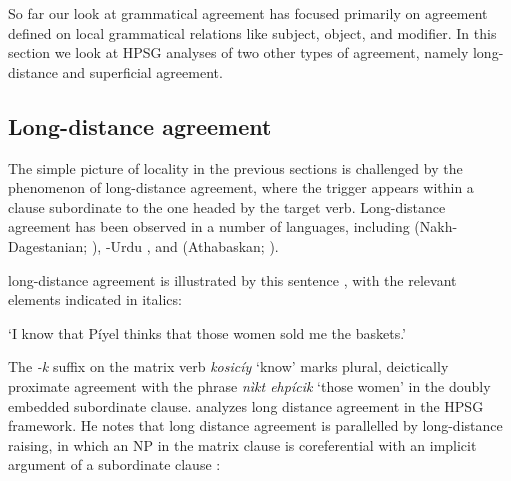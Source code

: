 \documentclass[output=paper,biblatex,babelshorthands,newtxmath,draftmode,colorlinks,citecolor=brown]{langscibook}
\begin{document}
So far our look at grammatical agreement has focused primarily on agreement defined on local grammatical relations like subject, object, and modifier.  In this section we look at HPSG analyses of two other types of agreement, namely long-distance and superficial agreement.  

\subsection{Long-distance agreement}
\label{LDA}

The simple picture of locality in the previous sections is challenged by the phenomenon of
long-distance agreement, where the trigger appears within a clause subordinate to the one headed by
the target verb.  Long-distance agreement has been observed in a number of languages, including
 (Nakh-Dagestanian; \citealt{polinsky+potsdam:2001}), -Urdu \citep{bhatt:2005},
and  (Athabaskan; \citealt{bruening:2001,LeSourd:2018}).

 long-distance agreement is illustrated by this sentence
\citep[example\,(5)]{LeSourd:2018}, with the relevant elements indicated in italics: 


\begin{exe}
\ex\label{baskets}
\glt `I know that Píyel thinks that those women sold me the baskets.’
\end{exe}

\noindent
The \textit{-k} suffix on the matrix verb \textit{kosicíy} `know' marks plural, deictically proximate agreement with the phrase \textit{n\`{i}kt ehpícik} `those women'  in the doubly embedded subordinate clause.  \citet{LeSourd:2018} analyzes  long distance agreement in the HPSG framework.   He notes that   long distance agreement is parallelled by long-distance raising, in which an NP in the matrix clause is coreferential with an implicit argument of a subordinate clause \citep[example\,(4)]{LeSourd:2018}:  
\end{document}
